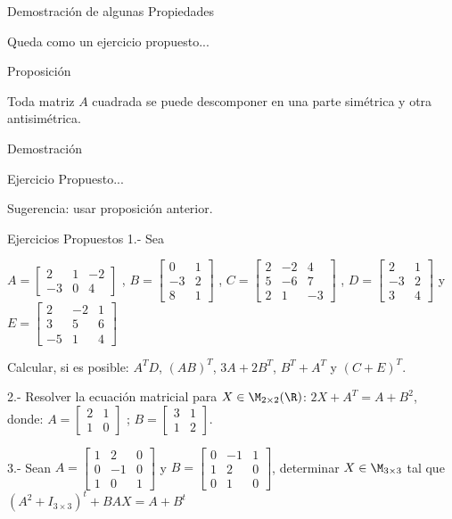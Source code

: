 {Demostración de algunas Propiedades}

Queda como un ejercicio  propuesto...


{Proposición}

Toda matriz $A$ cuadrada se puede descomponer en una parte simétrica y otra antisimétrica.

Demostración

Ejercicio Propuesto...

Sugerencia: usar proposición anterior.


{Ejercicios Propuestos}
1.- Sea 

 $ A= \begin{bmatrix}
2 &  1 & -2 \\
-3 &  0 &  4
\end{bmatrix}$
, 
 $ B= \begin{bmatrix}
 0 &   1\\
-3 &  2  \\
 8 &  1
\end{bmatrix}$
, 
 $ C= \begin{bmatrix}
2   &  -2   & 4   \\
5   &  -6  &  7\\
2   &   1   & -3
\end{bmatrix}$
,
$ D= \begin{bmatrix}
2 &   1\\
-3 &  2  \\
 3  &  4
\end{bmatrix}$
y 
$ E= \begin{bmatrix}
2   &  -2   & 1   \\
3   &  5    &  6\\
-5  &   1   & 4
\end{bmatrix}$

Calcular, si es posible:  
$A^T D$, $(AB)^T$, $3A+2B^T$, $B^T+A^T$ y $(C+E)^T$.

2.- Resolver la ecuación matricial para $X \in \M_{2\times 2}(\R)$: $2X +A^T=A+B^2$, donde:
 $A= \begin{bmatrix}
2 &   1\\
1 &  0
\end{bmatrix}$
;
 $B= \begin{bmatrix}
3 &   1\\
1 &  2
\end{bmatrix}$.

3.- Sean
$ A= \begin{bmatrix}
1 & 2 & 0\\
0 & -1 & 0\\
1 & 0 & 1
\end{bmatrix}$
y
$ B = \begin{bmatrix}
0 & -1 & 1\\
1 & 2 & 0\\
0 & 1 & 0
\end{bmatrix}$,
determinar $ X \in \M_{3\times 3}$ tal que 
$(A^2 + I_{3\times 3} )^t +BAX = A + B^t$

